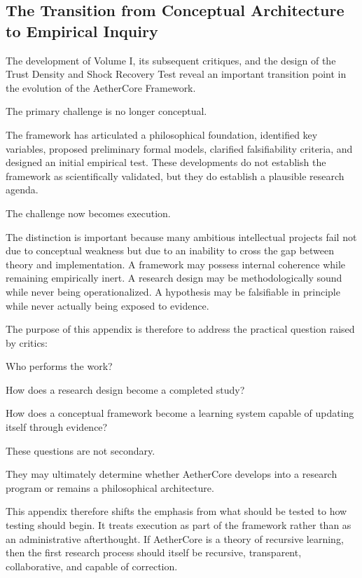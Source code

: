 \documentclass[12pt]{article}
\begin{document}
\subsection{The Transition from Conceptual Architecture to Empirical Inquiry}

The development of Volume I, its subsequent critiques, and the design of the Trust Density and Shock Recovery Test reveal an important transition point in the evolution of the AetherCore Framework.

The primary challenge is no longer conceptual.

The framework has articulated a philosophical foundation, identified key variables, proposed preliminary formal models, clarified falsifiability criteria, and designed an initial empirical test. These developments do not establish the framework as scientifically validated, but they do establish a plausible research agenda.

The challenge now becomes execution.

The distinction is important because many ambitious intellectual projects fail not due to conceptual weakness but due to an inability to cross the gap between theory and implementation. A framework may possess internal coherence while remaining empirically inert. A research design may be methodologically sound while never being operationalized. A hypothesis may be falsifiable in principle while never actually being exposed to evidence.

The purpose of this appendix is therefore to address the practical question raised by critics:

Who performs the work?

How does a research design become a completed study?

How does a conceptual framework become a learning system capable of updating itself through evidence?

These questions are not secondary.

They may ultimately determine whether AetherCore develops into a research program or remains a philosophical architecture.

This appendix therefore shifts the emphasis from what should be tested to how testing should begin. It treats execution as part of the framework rather than as an administrative afterthought. If AetherCore is a theory of recursive learning, then the first research process should itself be recursive, transparent, collaborative, and capable of correction.
\end{document}
